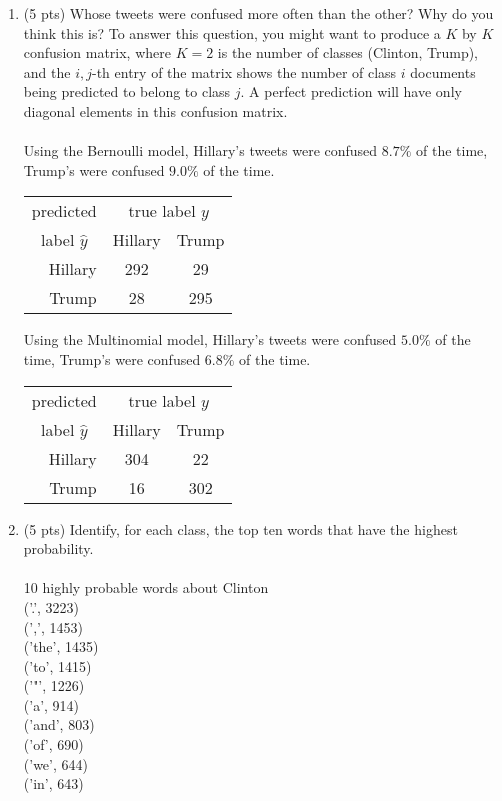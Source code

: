 \documentclass[]{article}
\begin{document}
\begin{enumerate}
	\item (5 pts) Whose tweets were confused more often than the other? Why do you think this is? To answer this question, you might want to produce a $K$ by $K$ confusion matrix, where $K = 2$ is the number of classes (Clinton, Trump), and the $i, j$-th entry of the matrix shows the number of class $i$ documents being predicted to belong to class $j$. A perfect prediction will have only diagonal elements in this confusion matrix.\\
	\\
	 Using the Bernoulli model,  Hillary's tweets were confused $8.7\%$ of the time, Trump's were confused $9.0\%$ of the time.
	 \begin{center}
	 	\begin{tabular}{|r|c|c|}\hline
	 		\multicolumn{1}{|c|}{predicted} & \multicolumn{2}{c|}{true label $y$}\\ \cline{2-3}
	 		\multicolumn{1}{|c|}{label $\hat{y}$} & Hillary & Trump \\ \hline
	 		Hillary   & 292 & 29 \\ \hline
	 		Trump     & 28 &  295 \\ \hline 
	 	\end{tabular} 
	 \end{center}
	
	 Using the Multinomial model,  Hillary's tweets were confused $5.0\%$ of the time, Trump's were confused $6.8\%$ of the time.
	 \begin{center}
		 	\begin{tabular}{|r|c|c|}\hline
		 		\multicolumn{1}{|c|}{predicted} & \multicolumn{2}{c|}{true label $y$}\\ \cline{2-3}
		 		\multicolumn{1}{|c|}{label $\hat{y}$} & Hillary & Trump \\ \hline
		 		Hillary   & 304 & 22 \\ \hline
		 		Trump     & 16 &  302 \\ \hline  	 		
		 	\end{tabular}
	 \end{center}
	 
	 \item (5 pts)  Identify, for each class, the top ten words that have the highest probability.\\
	 \\
		 10 highly probable words about Clinton\\
		 ('.', 3223)\\
		 (',', 1453)\\
		 ('the', 1435)\\
		 ('to', 1415)\\
		 ('"', 1226)\\
		 ('a', 914)\\
		 ('and', 803)\\
		 ('of', 690)\\
		 ('we', 644)\\
		 ('in', 643)\\ 
		 

\end{enumerate}
\end{document}
